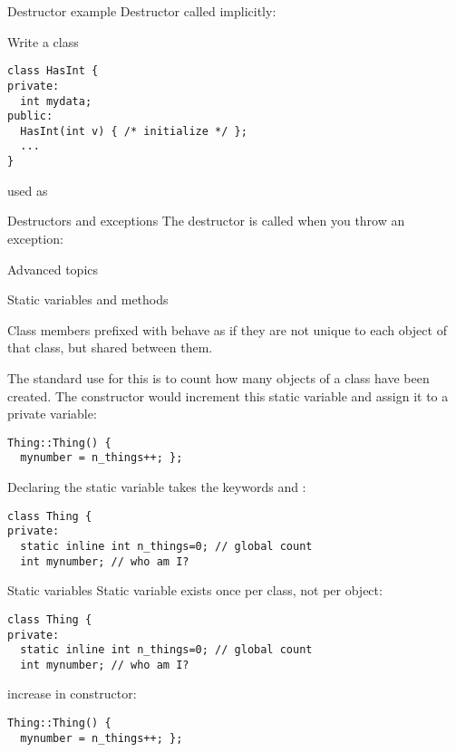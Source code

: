 \begin{slide}{Destructor example}
  \label{sl:class-destruct-ex2}
  Destructor called implicitly:
\end{slide}

\begin{exercise}
  \label{ex:destruct-trace}
  Write a class
\begin{lstlisting}
class HasInt {
private:
  int mydata;
public:
  HasInt(int v) { /* initialize */ };
  ...
}
\end{lstlisting}
used as
%
\end{exercise}

\begin{block}{Destructors and exceptions}
  \label{sl:exceptobj}
  The destructor is called when you throw an exception:
\end{block}

 {Advanced topics}

 {Static variables and methods}
\label{sec:class-static}

Class members prefixed with  behave as if
they are not unique to each object of that class,
but shared between them.

The standard use for this is to count how many objects
of a class have been created.
The constructor would increment this static variable
and assign it to a private variable:
\begin{lstlisting}
Thing::Thing() {
  mynumber = n_things++; };
\end{lstlisting}

Declaring the static variable takes the keywords
 and :
\begin{lstlisting}
class Thing {
private:
  static inline int n_things=0; // global count
  int mynumber; // who am I?
\end{lstlisting}

\begin{slide}{Static variables}
  \label{sl:static-var}
Static variable exists once per class, not per object:
\begin{lstlisting}
class Thing {
private:
  static inline int n_things=0; // global count
  int mynumber; // who am I?
\end{lstlisting}
increase in constructor:
\begin{lstlisting}
Thing::Thing() {
  mynumber = n_things++; };
\end{lstlisting}
\end{slide}

